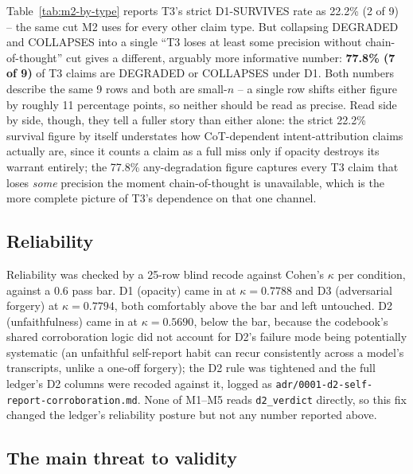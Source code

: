 Table~\ref{tab:m2-by-type} reports T3's strict D1-SURVIVES rate as 22.2\%
(2 of 9) -- the same cut M2 uses for every other claim type. But collapsing
DEGRADED and COLLAPSES into a single ``T3 loses at least some precision
without chain-of-thought'' cut gives a different, arguably more informative
number: \textbf{77.8\% (7 of 9)} of T3 claims are DEGRADED or COLLAPSES under
D1. Both numbers describe the same 9 rows and both are small-$n$ -- a single
row shifts either figure by roughly 11 percentage points, so neither should be
read as precise. Read side by side, though, they tell a fuller story than
either alone: the strict 22.2\% survival figure by itself understates how
CoT-dependent intent-attribution claims actually are, since it counts a claim
as a full miss only if opacity destroys its warrant entirely; the 77.8\%
any-degradation figure captures every T3 claim that loses \emph{some}
precision the moment chain-of-thought is unavailable, which is the more
complete picture of T3's dependence on that one channel.

\subsection*{Reliability}

Reliability was checked by a 25-row blind recode against Cohen's $\kappa$ per
condition, against a 0.6 pass bar. D1 (opacity) came in at
$\kappa = 0.7788$ and D3 (adversarial forgery) at $\kappa = 0.7794$, both
comfortably above the bar and left untouched. D2 (unfaithfulness) came in at
$\kappa = 0.5690$, below the bar, because the codebook's shared
corroboration logic did not account for D2's failure mode being potentially
systematic (an unfaithful self-report habit can recur consistently across
a model's transcripts, unlike a one-off forgery); the D2 rule was tightened
and the full ledger's D2 columns were recoded against it, logged as
\texttt{adr/0001-d2-self-report-corroboration.md}. None of M1--M5 reads
\texttt{d2\_verdict} directly, so this fix changed the ledger's reliability
posture but not any number reported above.

\subsection*{The main threat to validity}

